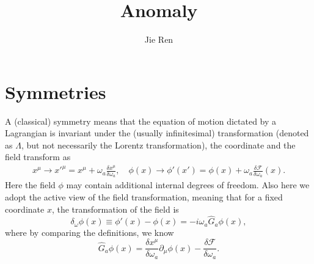 \documentclass[aps,prb,superscriptaddress,nofootinbib]{revtex4}
\begin{document}
\title{Anomaly}
\author{Jie Ren}



\maketitle

\tableofcontents



\section{Symmetries}

A (classical) symmetry means that the equation of motion dictated by a Lagrangian is invariant under the (usually infinitesimal) transformation (denoted as $\Lambda$, but not necessarily the Lorentz transformation), the coordinate and the field transform as
\begin{equation}
\begin{aligned}
	x^\mu\rightarrow {x'}^\mu = x^\mu + \omega_a \frac{\delta x^\mu}{\delta \omega_a}, \quad
	\phi(x) \rightarrow \phi'(x') = \phi(x) + \omega_a \frac{\delta \mathcal F}{\delta \omega_a}(x).
\end{aligned}
\end{equation}
Here the field $\phi$ may contain additional internal degrees of freedom. 
Also here we adopt the active view of the field transformation, meaning that for a fixed coordinate $x$, the transformation of the field is
\begin{equation}
	\delta_\omega \phi(x) \equiv \phi'(x) - \phi(x) = - i\omega_a \hat G_a \phi(x),
\end{equation}
where by comparing the definitions, we know
\begin{equation}
	\hat G_a\phi(x) = \frac{\delta x^\mu}{\delta\omega_a} \partial_\mu \phi(x) - \frac{\delta\mathcal F}{\delta\omega_a}.
\end{equation}
\end{document}
